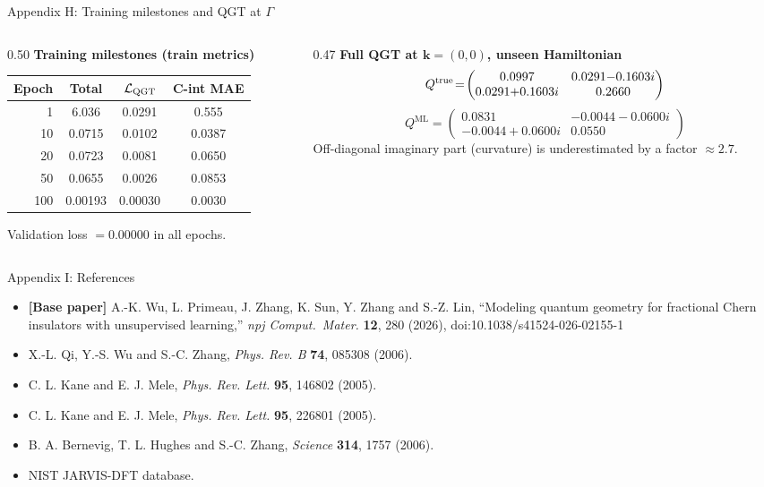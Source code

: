 \documentclass[aspectratio=169,11pt]{beamer}
\newcommand{\ML}{\mathrm{ML}}
\begin{document}
\begin{frame}{Appendix H: Training milestones and QGT at $\Gamma$}
\scriptsize
\begin{columns}[T]
\begin{column}{0.50\textwidth}
\centering
\textbf{Training milestones (train metrics)}

\vspace{0.05cm}
\begin{tabular}{@{}rccc@{}}
\toprule
Epoch & Total & $\mathcal L_{\rm QGT}$ & C-int MAE\\
\midrule
1 & 6.036 & 0.0291 & 0.555\\
10 & 0.0715 & 0.0102 & 0.0387\\
20 & 0.0723 & 0.0081 & 0.0650\\
50 & 0.0655 & 0.0026 & 0.0853\\
100 & 0.00193 & 0.00030 & 0.0030\\
\bottomrule
\end{tabular}

\vspace{0.05cm}
Validation loss $=0.00000$ in all epochs.
\end{column}

\begin{column}{0.47\textwidth}
\textbf{Full QGT at $\mathbf k=(0,0)$, unseen Hamiltonian}
\[
Q^{\rm true}\!=\!\begin{pmatrix}0.0997&0.0291{-}0.1603i\\0.0291{+}0.1603i&0.2660\end{pmatrix}
\]
\[
Q^{\ML}\!=\!\begin{pmatrix}0.0831&-0.0044{-}0.0600i\\-0.0044{+}0.0600i&0.0550\end{pmatrix}
\]
Off-diagonal imaginary part (curvature) is underestimated by a factor $\approx2.7$.
\end{column}
\end{columns}
\end{frame}

\begin{frame}{Appendix I: References}
\footnotesize
\begin{itemize}
\item \textbf{[Base paper]} A.-K. Wu, L. Primeau, J. Zhang, K. Sun, Y. Zhang and S.-Z. Lin,
``Modeling quantum geometry for fractional Chern insulators with unsupervised learning,''
\textit{npj Comput.\ Mater.} \textbf{12}, 280 (2026), doi:10.1038/s41524-026-02155-1
\item X.-L. Qi, Y.-S. Wu and S.-C. Zhang, \textit{Phys. Rev. B} \textbf{74}, 085308 (2006).
\item C. L. Kane and E. J. Mele, \textit{Phys. Rev. Lett.} \textbf{95}, 146802 (2005).
\item C. L. Kane and E. J. Mele, \textit{Phys. Rev. Lett.} \textbf{95}, 226801 (2005).
\item B. A. Bernevig, T. L. Hughes and S.-C. Zhang, \textit{Science} \textbf{314}, 1757 (2006).
\item NIST JARVIS-DFT database.
\end{itemize}
\end{frame}
\end{document}
